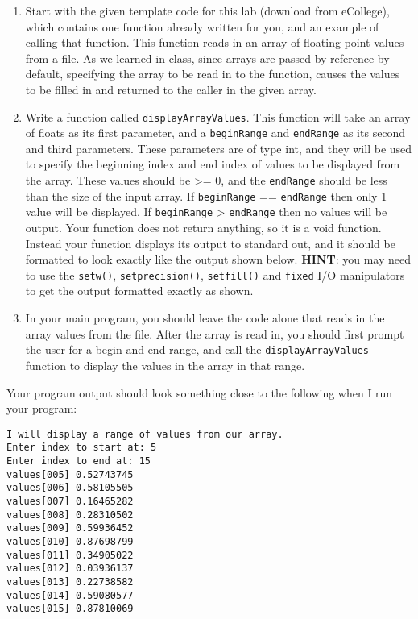 \documentclass[11pt]{article}
\begin{document}
\begin{enumerate}
\item Start with the given template code for this lab (download from
eCollege), which contains one function already written for you, and
an example of calling that function.  This function reads in an
array of floating point values from a file.  As we learned in
class, since arrays are passed by reference by default, specifying
the array to be read in to the function, causes the values to be
filled in and returned to the caller in the given array.

\item Write a function called \verb~displayArrayValues~.  This function will
take an array of floats as its first parameter, and a \verb~beginRange~
and \verb~endRange~ as its second and third parameters.  These
parameters are of type int, and they will be used to specify the
beginning index and end index of values to be displayed from the
array.  These values should be >= 0, and the \verb~endRange~ should be
less than the size of the input array.  If \verb~beginRange~ ==
\verb~endRange~ then only 1 value will be displayed.  If \verb~beginRange~ >
\verb~endRange~ then no values will be output. Your function does not
return anything, so it is a void function.  Instead your function
displays its output to standard out, and it should be formatted to
look exactly like the output shown below.  \textbf{HINT}: you may need to
use the \verb~setw()~, \verb~setprecision()~, \verb~setfill()~ and \verb~fixed~ I/O
manipulators to get the output formatted exactly as shown.

\item In your main program, you should leave the code alone that reads in
the array values from the file.  After the array is read in, you
should first prompt the user for a begin and end range, and call
the \verb~displayArrayValues~ function to display the values in the
array in that range.
\end{enumerate}

Your program output should look something close to the following when I
run your program:

\begin{verbatim}
I will display a range of values from our array.
Enter index to start at: 5
Enter index to end at: 15
values[005] 0.52743745
values[006] 0.58105505
values[007] 0.16465282
values[008] 0.28310502
values[009] 0.59936452
values[010] 0.87698799
values[011] 0.34905022
values[012] 0.03936137
values[013] 0.22738582
values[014] 0.59080577
values[015] 0.87810069
\end{verbatim}
\end{document}
